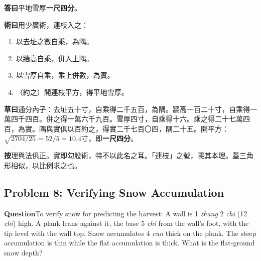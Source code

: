 \documentclass[11pt,a4paper]{article}
\newcommand{\DaCN}{\textbf{\color{headcolor}答曰}}
\newcommand{\ShuCN}{\textbf{\color{headcolor}術曰}}
\newcommand{\CaoCN}{\textbf{\color{headcolor}草曰}}
\newcommand{\AnCN}{\textbf{\color{headcolor}按}}
\newcommand{\WenEN}{\textbf{\color{headcolor}Question}}
\begin{document}
\vspace{0.5em}
\DaCN{}\quad 平地雪厚\textbf{一尺四分}。

\vspace{0.5em}
\ShuCN{}\quad 用少廣術，連枝入之：
\begin{enumerate}[noitemsep,topsep=0pt]
  \item 以去址之數自乘，為隅。
  \item 以牆高自乘，併入上隅。
  \item 以雪厚自乘，乘上併數，為實。
  \item（約之）開連枝平方，得平地雪厚。
\end{enumerate}

\vspace{0.5em}
\CaoCN{}\quad 通分內子：去址五十寸，自乘得二千五百，為隅。牆高一百二十寸，自乘得一萬四千四百。併之得一萬六千九百。雪厚四寸，自乘得十六。乘之得二十七萬四百，為實。隅與實俱以百約之，得實二千七百〇四，隅二十五。開平方：$\sqrt{2704/25} = 52/5 = 10.4$寸，即\textbf{一尺四分}。

\vspace{0.5em}
\AnCN{}\quad 理與法俱正。實即勾股術，特不以此名之耳。「連枝」之號，隱其本理。蓋三角形相似，以比例求之也。

\switchcolumn[1]
\subsection*{Problem 8: Verifying Snow Accumulation}
\label{sec:junjiyanxue}

\vspace{0.5em}
\WenEN{}\quad To verify snow for predicting the harvest: A wall is 1 \textit{zhang} 2 \textit{chi} (12 \textit{chi}) high. A plank leans against it, the base 5 \textit{chi} from the wall's foot, with the tip level with the wall top. Snow accumulates 4 \textit{cun} thick on the plank. The steep accumulation is thin while the flat accumulation is thick. What is the flat-ground snow depth?

\begin{center}
\end{center}
\end{document}
